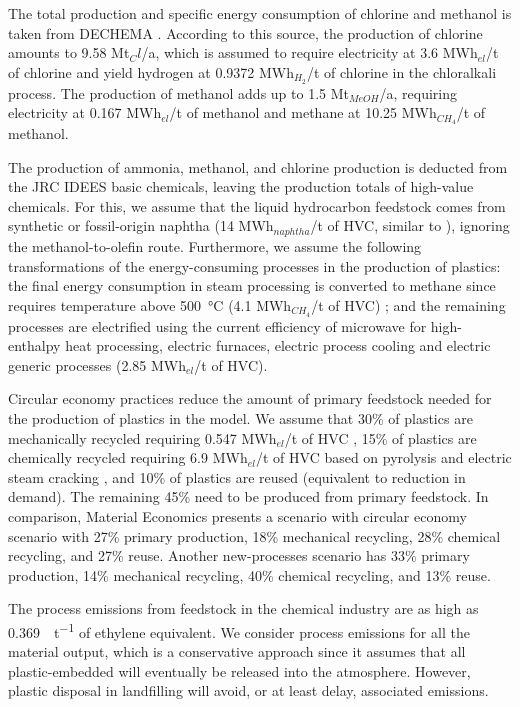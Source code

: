 The total production and specific energy consumption of chlorine and methanol is
taken from DECHEMA . According to this
source, the production of chlorine amounts to 9.58 Mt$_Cl$/a, which is assumed
to require electricity at 3.6 MWh$_{el}$/t of chlorine and yield hydrogen at
0.9372 MWh$_{H_2}$/t of chlorine in the chloralkali process. The production of
methanol adds up to 1.5 Mt$_{MeOH}$/a, requiring electricity at 0.167 MWh$_{el}$/t
of methanol and methane at 10.25 MWh$_{CH_4}$/t of methanol.

The production of ammonia, methanol, and chlorine production is deducted from
the JRC IDEES basic chemicals, leaving the production totals of high-value
chemicals. For this, we assume that the liquid hydrocarbon feedstock comes from
synthetic or fossil-origin naphtha (14 MWh$_{naphtha}$/t of HVC, similar to
), ignoring the methanol-to-olefin
route. Furthermore, we assume the following transformations of the
energy-consuming processes in the production of plastics: the final energy
consumption in steam processing is converted to methane since requires
temperature above \SI{500}{\celsius} (4.1 MWh$_{CH_4}$/t of HVC)
; and the remaining processes are
electrified using the current efficiency of microwave for high-enthalpy heat
processing, electric furnaces, electric process cooling and electric generic
processes (2.85 MWh$_{el}$/t of HVC).

Circular economy practices reduce the amount of primary feedstock needed for the
production of plastics in the model. We assume that 30\% of plastics are
mechanically recycled requiring 0.547 MWh$_{el}$/t of HVC
, 15\% of plastics are chemically recycled
requiring 6.9 MWh$_{el}$/t of HVC based on pyrolysis and electric steam cracking
, and 10\% of plastics are
reused (equivalent to reduction in demand). The remaining 45\% need to be
produced from primary feedstock. In comparison, Material Economics
 presents a scenario with circular economy scenario with
27\% primary production, 18\% mechanical recycling, 28\% chemical recycling, and
27\% reuse. Another new-processes scenario has 33\% primary production, 14\%
mechanical recycling, 40\% chemical recycling, and 13\% reuse.

The process emissions from feedstock in the chemical industry are as high as
\SI{0.369}{\tco\per\tonne} of ethylene equivalent. We consider process emissions
for all the material output, which is a conservative approach since it assumes
that all plastic-embedded \co will eventually be released into the atmosphere.
However, plastic disposal in landfilling will avoid, or at least delay,
associated \co emissions.

